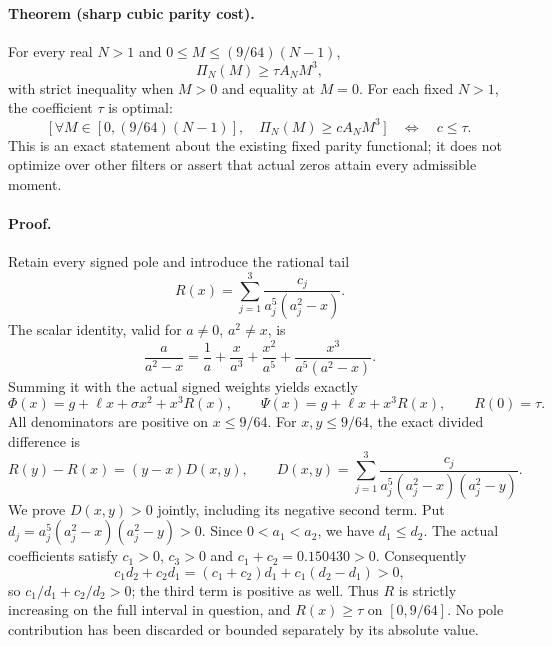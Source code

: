 \paragraph{Theorem (sharp cubic parity cost).}
For every real \(N>1\) and \(0\le M\le(9/64)(N-1)\),
\begin{equation}\label{eq:sharp-cubic-parity-cost}
 \Pi_N(M)\ge\tau A_NM^3,
\end{equation}
with strict inequality when \(M>0\) and equality at \(M=0\).
For each fixed \(N>1\), the coefficient \(\tau\) is optimal:
\begin{equation}\label{eq:cubic-parity-optimality}
 \bigl[\,\forall M\in[0,(9/64)(N-1)],\quad
        \Pi_N(M)\ge cA_NM^3\,\bigr]
 \quad\Longleftrightarrow\quad c\le\tau.
\end{equation}
This is an exact statement about the existing fixed parity functional;
it does not optimize over other filters or assert that actual zeros
attain every admissible moment.

\paragraph{Proof.}
Retain every signed pole and introduce the rational tail
\[
 R(x)=\sum_{j=1}^3\frac{c_j}{a_j^5(a_j^2-x)}.
\]
The scalar identity, valid for \(a\ne0\), \(a^2\ne x\), is
\[
 \frac{a}{a^2-x}=\frac1a+\frac{x}{a^3}
       +\frac{x^2}{a^5}+\frac{x^3}{a^5(a^2-x)}.
\]
Summing it with the actual signed weights yields exactly
\begin{equation}\label{eq:cubic-profile-tail}
 \Phi(x)=g+\ell x+\sigma x^2+x^3R(x),\qquad
 \Psi(x)=g+\ell x+x^3R(x),\qquad R(0)=\tau.
\end{equation}
All denominators are positive on \(x\le9/64\).
For \(x,y\le9/64\), the exact divided difference is
\[
 R(y)-R(x)=(y-x)D(x,y),\qquad
 D(x,y)=\sum_{j=1}^3\frac{c_j}
 {a_j^5(a_j^2-x)(a_j^2-y)}.
\]
We prove \(D(x,y)>0\) jointly, including its negative second term.
Put \(d_j=a_j^5(a_j^2-x)(a_j^2-y)>0\).
Since \(0<a_1<a_2\), we have \(d_1\le d_2\).
The actual coefficients satisfy \(c_1>0\), \(c_3>0\) and
\(c_1+c_2=0.150430>0\).  Consequently
\[
 c_1d_2+c_2d_1=(c_1+c_2)d_1+c_1(d_2-d_1)>0,
\]
so \(c_1/d_1+c_2/d_2>0\); the third term is positive as well.
Thus \(R\) is strictly increasing on the full interval in question,
and \(R(x)\ge\tau\) on \([0,9/64]\).
No pole contribution has been discarded or bounded separately by its
absolute value.

